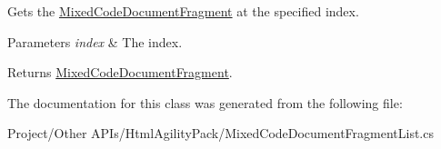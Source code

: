 Gets the \hyperlink{class_html_agility_pack_1_1_mixed_code_document_fragment}{Mixed\+Code\+Document\+Fragment} at the specified index. 


\begin{DoxyParams}{Parameters}
{\em index} & The index.\\
\hline
\end{DoxyParams}
\begin{DoxyReturn}{Returns}
\hyperlink{class_html_agility_pack_1_1_mixed_code_document_fragment}{Mixed\+Code\+Document\+Fragment}.
\end{DoxyReturn}


The documentation for this class was generated from the following file\+:\begin{DoxyCompactItemize}
\item 
Project/\+Other A\+P\+Is/\+Html\+Agility\+Pack/Mixed\+Code\+Document\+Fragment\+List.\+cs\end{DoxyCompactItemize}
